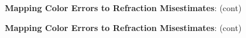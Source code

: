 \documentclass[DM,toc]{lsstdoc}
\begin{document}
\begin{figure}
    \ContinuedFloat
    \centering
    \caption[]{{\bf Mapping Color Errors to Refraction Misestimates}: (cont)}
    \label{rerr2}
\end{figure}
\begin{figure}
    \ContinuedFloat
    \centering
    \caption[]{{\bf Mapping Color Errors to Refraction Misestimates}: (cont)}
    \label{rerr2}
\end{figure}
\clearpage
\end{document}
